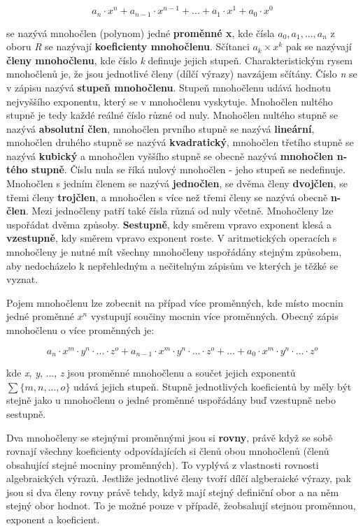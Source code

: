 $$ a_n \cdot x^n + a_{n-1} \cdot x^{n-1} + ... + a_1 \cdot x^1 + a_0 \cdot x^0  $$

se nazývá  mnohočlen (polynom) jedné {\bf proměnné x}, kde čísla $a_0, a_1, ..., a_n$ z oboru {\it R} se nazývají {\bf koeficienty mnohočlenu}. Sčítanci $ a_k\times x^k $ pak se nazývají {\bf členy mnohočlenu}, kde číslo {\it k} definuje jejich stupeň. Charakteristickým rysem mnohočlenů je, že jsou jednotlivé členy (dílčí výrazy) navzájem sčítány. Číslo {\it n} se v zápisu nazývá {\bf stupeň mnohočlenu}. Stupeň mnohočlenu udává hodnotu nejvyššího exponentu, který se v mnohočlenu vyskytuje. Mnohočlen nultého stupně je tedy každé reálné číslo různé od nuly. Mnohočlen nultého stupně se nazývá {\bf absolutní člen}, mnohočlen prvního stupně se nazývá {\bf lineární}, mnohočlen druhého stupně se nazývá {\bf kvadratický}, mnohočlen třetího stupně se nazývá {\bf kubický} a mnohočlen vyššího stupně se obecně nazývá {\bf mnohočlen n-tého stupně}. Číslu nula se říká nulový mnohočlen - jeho stupeň se nedefinuje. Mnohočlen s jedním členem se nazývá {\bf jednočlen}, se dvěma členy {\bf dvojčlen}, se třemi členy {\bf trojčlen}, a mnohočlen s více než třemi členy se nazývá obecně {\bf n-člen}. Mezi jednočleny patří také čísla různá od nuly včetně. Mnohočleny lze uspořádat dvěma způsoby. {\bf Sestupně}, kdy směrem vpravo exponent klesá a {\bf vzestupně}, kdy směrem vpravo exponent roste. V aritmetických operacích s mnohočleny je nutné mít všechny mnohočleny uspořádány stejným způsobem, aby nedocházelo k nepřehledným a nečitelným zápisům ve kterých je těžké se vyznat.

Pojem mnohočlenu lze zobecnit na případ více proměnných, kde místo mocnin jedné proměnné $x^n$ vystupují součiny mocnin více proměnných. Obecný zápis mnohočlenu o více proměnných je:

$$ a_n \cdot x^m\cdot y^n \cdot ... \cdot z^o + a_{n-1} \cdot x^m\cdot y^n \cdot ... \cdot z^o + ... + a_0 \cdot x^m\cdot y^n \cdot ... \cdot z^o $$

kde {\it x}, {\it y}, ..., {\it z} jsou proměnné mnohočlenu a součet jejich exponentů $\sum \{m, n, ..., o\}$ udává jejich stupeň. Stupně jednotlivých koeficientů by měly být stejně jako u mnohočlenu o jedné proměnné uspořádány buď vzestupně nebo sestupně.

Dva mnohočleny se stejnými proměnnými jsou si {\bf rovny}, právě když se sobě rovnají všechny koeficienty odpovídajících si členů obou mnohočlenů (členů obsahující stejné mocniny proměnných). To vyplývá z vlastnosti rovnosti algebraických výrazů. Jestliže jednotlivé členy tvoří dílčí algberaické výrazy, pak jsou si dva členy rovny právě tehdy, když mají stejný definiční obor a na něm stejný obor hodnot. To je možné pouze v případě, žeobsahují stejnou proměnnou, exponent a koeficient. 





